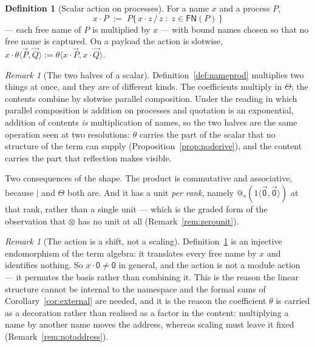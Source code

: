 \documentclass[11pt]{article}
\makeatletter
\theoremstyle{definition}
\newtheorem{definition}[theorem]{Definition}
\theoremstyle{remark}
\newtheorem{remark}[theorem]{Remark}
\newcommand{\pzero}{\mathsf{0}}
\newcommand{\quo}[1]{\ensuremath{@_{#1}}}
\newcommand{\dip}[2]{\ensuremath{\langle #1 , #2 \rangle}}
\newcommand{\FN}[1]{\ensuremath{\mathsf{FN}(#1)}}
\makeatother
\begin{document}
\begin{definition}[Scalar action on processes]
\label{def:scalaraction}
For a name $x$ and a process $P$,
\[
  x \cdot P \;:=\; P\{\, x \cdot z \,/\, z \;:\; z \in \FN{P} \,\}
\]
--- each free name of $P$ is multiplied by $x$ --- with bound names chosen so
that no free name is captured. On a payload the action is slotwise,
$x \cdot \theta\dip{\vec{P}}{\vec{Q}} :=
\theta\dip{x \cdot \vec{P}}{x \cdot \vec{Q}}$.
\end{definition}

\begin{remark}[The two halves of a scalar]
\label{rem:twohalves}
Definition~\ref{def:nameprod} multiplies two things at once, and they are of
different kinds. The coefficients multiply in $\Theta$; the contents combine by
slotwise parallel composition. Under the reading in which parallel composition
is addition on processes and quotation is an exponential, addition of contents
\emph{is} multiplication of names, so the two halves are the same operation seen
at two resolutions: $\theta$ carries the part of the scalar that no structure of
the term can supply (Proposition~\ref{prop:noderive}), and the content carries
the part that reflection makes visible.

Two consequences of the shape. The product is commutative and associative,
because $\mid$ and $\Theta$ both are. And it has a unit \emph{per rank}, namely
$\quo{s}(1\dip{\vec{\pzero}}{\vec{\pzero}})$ at that rank, rather than a single
unit --- which is the graded form of the observation that $\otimes$ has no unit
at all (Remark~\ref{rem:zerounit}).
\end{remark}

\begin{remark}[The action is a shift, not a scaling]
\label{rem:actionshift}
Definition~\ref{def:scalaraction} is an injective endomorphism of the term
algebra: it translates every free name by $x$ and identifies nothing. So
$x \cdot \pzero \neq \pzero$ in general, and the action is not a module action
--- it permutes the basis rather than combining it. This is the reason the
linear structure cannot be internal to the namespace and the formal sums of
Corollary~\ref{cor:external} are needed, and it is the reason the coefficient
$\theta$ is carried as a decoration rather than realised as a factor in the
content: multiplying a name by another name moves the address, whereas scaling
must leave it fixed (Remark~\ref{rem:notaddress}).
\end{remark}
\end{document}
